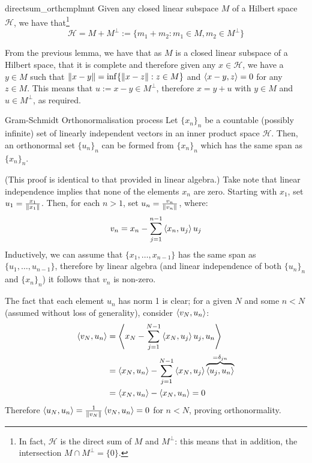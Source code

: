 \begin{btheorem}{}{directsum_orthcmplmnt}
Given any closed linear subspace $M$ of a Hilbert space $\mathcal{H}$, we have that\footnote{In fact, $\mathcal{H}$ is the direct sum of $M$ and $M^{\perp}$: this means that in addition, the intersection \mbox{$M \cap M^{\perp} = \{0\}$.}} \[\mathcal{H} = M + M^{\perp} := \{m_{1}+ m_{2} : m_{1} \in M, m_{2} \in M^{\perp} \} \] 
\end{btheorem}
\begin{bproof}{}{}
From the previous lemma, we have that as $M$ is a closed linear subspace of a Hilbert space, that it is complete and therefore given any $x\in\mathcal{H}$, we have a $y\in M$ such that \mbox{$\left\lVert x-y \right\rVert = \inf\{ \left\lVert x-z \right\rVert : z\in M \}$} and $\left\langle x-y, z \right\rangle = 0$ for any $z\in M$. This means that $u:= x-y \in M^{\perp}$, therefore $x = y + u$ with $y\in M$ and $u\in M^{\perp}$, as required.
\eop
\end{bproof}

\begin{btheorem}{Gram-Schmidt Orthonormalisation process}{}
Let $\{x_{n} \}_{n}$ be a countable (possibly infinite) set of linearly independent vectors in an inner product space $\mathcal{H}$. Then, an orthonormal set $\{u_{n}\}_{n}$ can be formed from $\{x_{n} \}_{n}$ which has the same span as $\{x_{n} \}_{n}$.
\end{btheorem}
\begin{bproof}{}{}
(This proof is identical to that provided in linear algebra.) Take note that linear independence implies that none of the elements $x_{n}$ are zero. Starting with $x_{1}$, set \mbox{$u_{1} = \frac{x_{1}}{\left\lVert x_{1} \right\rVert}$}. Then, for each $n>1$, set \mbox{$u_{n} = \frac{v_{n}}{\left\lVert v_{n} \right\rVert}$}, where:
\[ v_{n} = x_{n} - \sum_{j=1}^{n-1} \left\langle x_{n}, u_{j} \right\rangle u_{j} \]
Inductively, we can assume that \mbox{$\{ x_{1}, \ldots, x_{n-1} \}$} has the same span as \mbox{$\{ u_{1}, \ldots, u_{n-1} \}$,} therefore by linear algebra (and linear independence of both $\{u_{n}\}_{n}$ and $\{x_{n} \}_{n}$) it follows that $v_{n}$ is non-zero.

The fact that each element $u_{n}$ has norm 1 is clear; for a given $N$ and some $n<N$ (assumed without loss of generality), consider $\left\langle v_{N}, u_{n} \right\rangle$:
\begin{equation}
    \begin{split}
        \left\langle v_{N}, u_{n} \right\rangle &= \left\langle x_{N} - \sum_{j=1}^{N-1} \left\langle x_{N}, u_{j} \right\rangle u_{j} , u_{n} \right\rangle \\
        &= \left\langle x_{N}, u_{n} \right\rangle -\sum_{j=1}^{N-1} \left\langle x_{N}, u_{j} \right\rangle \overbrace{\left\langle  u_{j} , u_{n} \right\rangle}^{=\delta_{jn}} \\
        &= \left\langle x_{N}, u_{n} \right\rangle -  \left\langle x_{N}, u_{n} \right\rangle = 0 
    \end{split}
\end{equation}
Therefore \mbox{$\left\langle u_{N}, u_{n} \right\rangle = \frac{1}{\left\lVert v_{N} \right\rVert} \left\langle v_{N}, u_{n} \right\rangle = 0$} for $n<N$, proving orthonormality.
\eop
\end{bproof}



